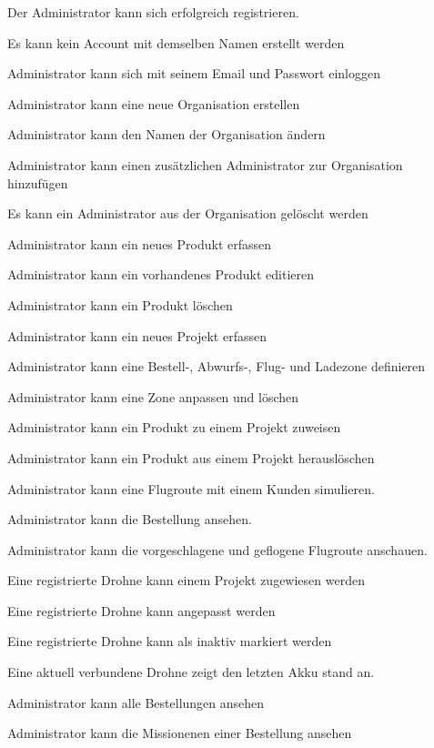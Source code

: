 \begin{todolist}
	\item[\done] Der Administrator kann sich erfolgreich registrieren.
	\item[\done] Es kann kein Account mit demselben Namen erstellt werden
	\item[\done] Administrator kann sich mit seinem Email und Passwort einloggen
	\item[\done] Administrator kann eine neue Organisation erstellen
	\item[\done] Administrator kann den Namen der Organisation ändern
	\item[\done] Administrator kann einen zusätzlichen Administrator zur Organisation hinzufügen
	\item[\done] Es kann ein Administrator aus der Organisation gelöscht werden
	\item[\done] Administrator kann ein neues Produkt erfassen
	\item[\done] Administrator kann ein vorhandenes Produkt editieren
	\item[\done] Administrator kann ein Produkt löschen
	\item[\done] Administrator kann ein neues Projekt erfassen
	\item[\done] Administrator kann eine Bestell-, Abwurfs-, Flug- und Ladezone definieren
	\item[\done] Administrator kann eine Zone anpassen und löschen
	\item[\done] Administrator kann ein Produkt zu einem Projekt zuweisen
	\item[\done] Administrator kann ein Produkt aus einem Projekt herauslöschen
	\item[\done] Administrator kann eine Flugroute mit einem Kunden simulieren.

	\item[\done] Administrator kann die Bestellung ansehen.
	\item[\done] Administrator kann die vorgeschlagene und geflogene Flugroute anschauen.

	\item[\done] Eine registrierte Drohne kann einem Projekt zugewiesen werden
	\item[\done] Eine registrierte Drohne kann angepasst werden
	\item[\done] Eine registrierte Drohne kann als inaktiv markiert werden
	\item[\done] Eine aktuell verbundene Drohne zeigt den letzten Akku stand an.
	\item[\done] Administrator kann alle Bestellungen ansehen
	\item[\done] Administrator kann die Missionenen einer Bestellung ansehen


\end{todolist}
